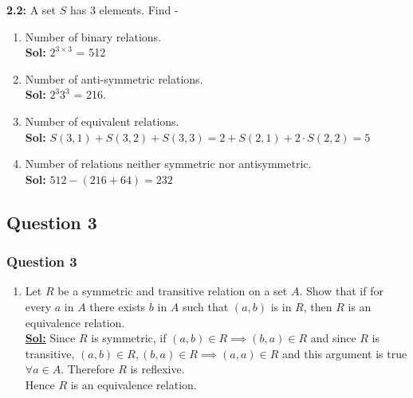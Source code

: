 \documentclass[xcolor=svgnames]{beamer}
\begin{document}
\begin{frame}
\textbf{2.2:} A set $S$ has $3$ elements. Find -  
\begin{enumerate}
    \item Number of binary relations.
    \\ \textbf{Sol:} $2^{3 \times 3}$ = 512
    \item Number of anti-symmetric relations.
    \\ \textbf{Sol:} $2^{3} 3^{3}$ = 216.
    \item Number of equivalent relations.
    \\ \textbf{Sol:} $S(3,1) + S(3,2) + S(3,3) = 2 + S(2,1) + 2\cdot S(2,2) = 5$
    \item Number of relations neither symmetric nor antisymmetric.
    \\ \textbf{Sol:} $512 - (216 + 64) = 232$
\end{enumerate}
\end{frame}




\subsection{Question 3}
\begin{frame}
\frametitle{Question 3}
\begin{enumerate}
    \item Let $R$ be a symmetric and transitive relation on a set $A$. Show that if for every $a$ in $A$ there exists $b$ in $A$ such that $(a, b)$ is in $R$, then $R$ is an equivalence relation. \\
    \textbf{\underline{Sol:}} Since $R$ is symmetric, if $(a, b) \in R \implies (b, a) \in R$ and since $R$ is transitive, $(a, b) \in R, (b, a) \in R \implies (a, a) \in R$ and this argument is true $\forall a \in A$. Therefore $R$ is reflexive.\\ 
    Hence $R$ is an equivalence relation.
\end{enumerate}
\end{frame}
\end{document}
